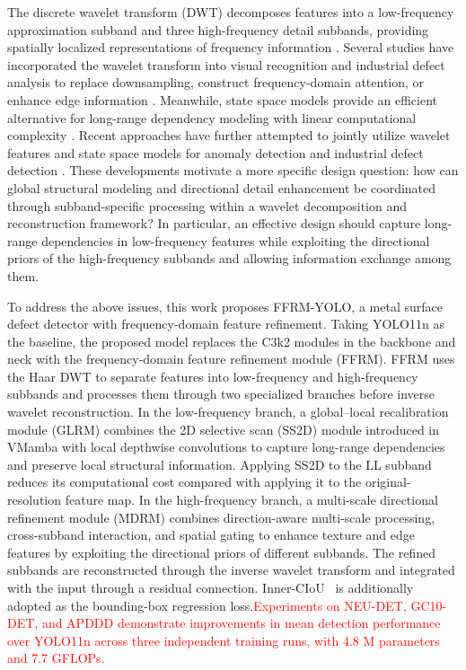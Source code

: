 \documentclass[pdflatex,sn-nature]{sn-jnl}
\newcommand{\rev}[1]{\textcolor{red}{#1}}
\begin{document}
    
    The discrete wavelet transform (DWT) decomposes features into a low-frequency approximation subband and three high-frequency detail subbands, providing spatially localized representations of frequency information \cite{Mallat1989Wavelet,Liu2018MWCNN}. Several studies have incorporated the wavelet transform into visual recognition and industrial defect analysis to replace downsampling, construct frequency-domain attention, or enhance edge information \cite{Cui2025SWT,Chen2026WTCFNet}. Meanwhile, state space models provide an efficient alternative for long-range dependency modeling with linear computational complexity \cite{Gu2024Mamba,Liu2024VMamba}. Recent approaches have further attempted to jointly utilize wavelet features and state space models for anomaly detection and industrial defect detection \cite{Zhang2025WaveMambaAD,Chen2026MWYOLO,Ge2026WaveMambaYOLO}. These developments motivate a more specific design question: how can global structural modeling and directional detail enhancement be coordinated through subband-specific processing within a wavelet decomposition and reconstruction framework? In particular, an effective design should capture long-range dependencies in low-frequency features while exploiting the directional priors of the high-frequency subbands and allowing information exchange among them.
    
    To address the above issues, this work proposes FFRM-YOLO, a metal surface defect detector with frequency-domain feature refinement. Taking YOLO11n as the baseline, the proposed model replaces the C3k2 modules in the backbone and neck with the frequency-domain feature refinement module (FFRM). FFRM uses the Haar DWT to separate features into low-frequency and high-frequency subbands and processes them through two specialized branches before inverse wavelet reconstruction. In the low-frequency branch, a global--local recalibration module (GLRM) combines the 2D selective scan (SS2D) module introduced in VMamba with local depthwise convolutions to capture long-range dependencies and preserve local structural information. Applying SS2D to the LL subband reduces its computational cost compared with applying it to the original-resolution feature map. In the high-frequency branch, a multi-scale directional refinement module (MDRM) combines direction-aware multi-scale processing, cross-subband interaction, and spatial gating to enhance texture and edge features by exploiting the directional priors of different subbands. The refined subbands are reconstructed through the inverse wavelet transform and integrated with the input through a residual connection. Inner-CIoU~\cite{Zhang2023InnerIoU} is additionally adopted as the bounding-box regression loss.\rev{Experiments on NEU-DET, GC10-DET, and APDDD demonstrate improvements in mean detection performance over YOLO11n across three independent training runs, with 4.8 M parameters and 7.7 GFLOPs.}
    
\end{document}
